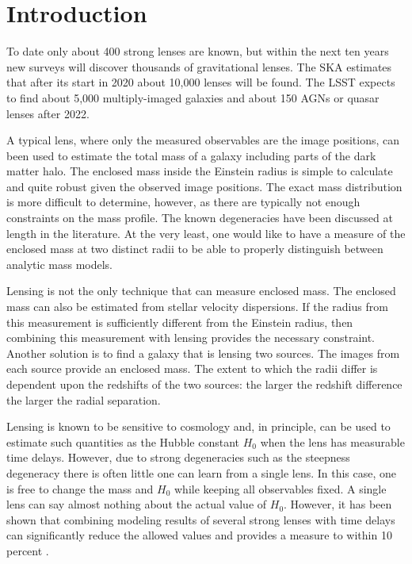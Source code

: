 \documentclass[onecolumn,galley]{mn2e}
\begin{document}
\section{Introduction}

To date only about 400 strong lenses are known, but within the next ten years
new surveys will discover thousands of gravitational lenses. The SKA estimates
that after its start in 2020 about 10,000 lenses will be found. The LSST
expects to find about 5,000 multiply-imaged galaxies and about 150 AGNs or
quasar lenses after 2022.

A typical lens, where only the measured observables are the image positions,
can been used to estimate the total mass of a galaxy including parts of the
dark matter halo. The enclosed mass inside the Einstein radius is simple to
calculate and quite robust given the observed image positions. The exact mass
distribution is more difficult to determine, however, as there are typically
not enough constraints on the mass profile. The known degeneracies have been
discussed at length in the literature. At the very least, one would like to
have a measure of the enclosed mass at two distinct radii to be able
to properly distinguish between analytic mass models. 

Lensing is not the only technique that can measure enclosed mass. The enclosed
mass can also be estimated from stellar velocity dispersions. If the radius
from this measurement is sufficiently different from the Einstein radius, then
combining this measurement with lensing provides the necessary constraint.
Another solution is to find a galaxy that is lensing two sources. The images
from each source provide an enclosed mass. The extent to which the radii
differ is dependent upon the redshifts of the two sources: the larger the
redshift difference the larger the radial separation.

Lensing is known to be sensitive to cosmology and, in principle, can be used to
estimate such quantities as the Hubble constant $H_0$ when the lens has
measurable time delays. However, due to strong degeneracies such as the
steepness degeneracy there is often little one can learn from a single lens. 
In this case, one is free to change the mass and $H_0$ while keeping
all observables fixed. A single lens can say almost nothing about the actual
value of $H_0$. However, it has been shown that combining modeling results
of several strong lenses with time delays can significantly reduce the allowed
values and provides a measure to within 10 percent \cite{}.
\end{document}
